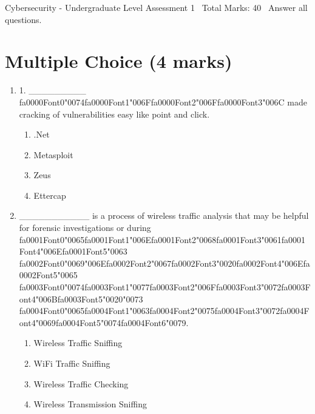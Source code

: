 \documentclass[12pt]{article}
\begin{document}
\begin{center}
Cybersecurity - Undergraduate Level Assessment 1 \
Total Marks: 40 \
Answer all questions.
\end{center}

\section*{Multiple Choice (4 marks)}
\begin{enumerate}[label=\arabic*.]
\item 1. \_\_\_\_\_\_\_\_\_ {\csname fa0000Font0\endcsname\char"0074}{\csname fa0000Font1\endcsname\char"006F}{\csname fa0000Font2\endcsname\char"006F}{\csname fa0000Font3\endcsname\char"006C} made cracking of vulnerabilities easy like point and click.
\begin{enumerate}[label=(\alph*)]
    \item .Net
    \item Metasploit
    \item Zeus
    \item Ettercap
\end{enumerate}
\item \_\_\_\_\_\_\_\_\_\_\_ is a process of wireless traffic analysis that may be helpful for forensic investigations or during {\csname fa0001Font0\endcsname\char"0065}{\csname fa0001Font1\endcsname\char"006E}{\csname fa0001Font2\endcsname\char"0068}{\csname fa0001Font3\endcsname\char"0061}{\csname fa0001Font4\endcsname\char"006E}{\csname fa0001Font5\endcsname\char"0063} {\csname fa0002Font0\endcsname\char"0069}{\char"006E}{\csname fa0002Font2\endcsname\char"0067}{\csname fa0002Font3\endcsname\char"0020}{\csname fa0002Font4\endcsname\char"006E}{\csname fa0002Font5\endcsname\char"0065} {\csname fa0003Font0\endcsname\char"0074}{\csname fa0003Font1\endcsname\char"0077}{\csname fa0003Font2\endcsname\char"006F}{\csname fa0003Font3\endcsname\char"0072}{\csname fa0003Font4\endcsname\char"006B}{\csname fa0003Font5\endcsname\char"0020}{\char"0073} {\csname fa0004Font0\endcsname\char"0065}{\csname fa0004Font1\endcsname\char"0063}{\csname fa0004Font2\endcsname\char"0075}{\csname fa0004Font3\endcsname\char"0072}{\csname fa0004Font4\endcsname\char"0069}{\csname fa0004Font5\endcsname\char"0074}{\csname fa0004Font6\endcsname\char"0079}.
\begin{enumerate}[label=(\alph*)]
    \item Wireless Traffic Sniffing
    \item WiFi Traffic Sniffing
    \item Wireless Traffic Checking
    \item Wireless Transmission Sniffing
\end{enumerate}
\end{enumerate}
\end{document}
